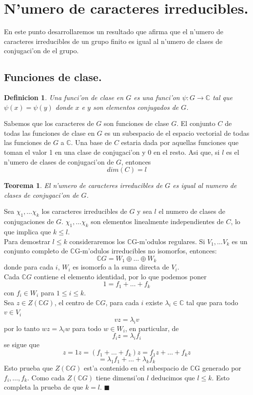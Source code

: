 \documentclass[a4paper,openright,12pt]{book}
\numberwithin{equation}{section} %
\newtheorem{teorema}{Teorema}[section] %
\newtheorem{definicion}{Definicion}[section] %
\newenvironment{proof}{\noindent{\it Demostracion:}}{\hfill$\blacksquare$} %
\begin{document}
\section{N'umero de caracteres irreducibles.}
En este punto desarrollaremos un resultado que afirma que el n'umero de caracteres irreducibles de un grupo finito es igual al n'umero de clases de conjugaci'on de el grupo.
\subsection{Funciones de clase.}
\begin{definicion}
Una funci'on de clase en $G$ es una funci'on $\psi : G \rightarrow \mathbb{C}$ tal que $\psi (x) = \psi (y)$ donde $x$ e $y$ son elementos conjugados de $G$.
\end{definicion}
Sabemos que los caracteres de $G$ son funciones de clase $G$. El conjunto $C$ de todas las funciones de clase en $G$ es un subespacio de el espacio vectorial de todas las funciones de $G$ a $\mathbb{C}$. Una base de $C$ estaria dada por aquellas funciones que toman el valor 1 en una clase de conjugaci'on y 0 en el resto. Asi que, si $l$ es el n'umero de clases de conjugaci'on de $G$, entonces
\[
dim(C)=l
\]
\begin{teorema}
El n'umero de caracteres irreducibles de $G$ es igual al numero de clases de conjugaci'on de $G$.
\end{teorema}
\begin{proof}
Sea $\chi_{1}, \ldots \chi_{k}$ los caracteres irreducibles de $G$ y sea $l$ el numero de clases de conjugaciones de $G$. $\chi_{1}, \ldots \chi_{k}$ son elementos linealmente independientes de $C$, lo que implica que $k \leq l$.\\
Para demostrar $l \leq k$ consideraremos los $\mathbb{C}$G-m'odulos regulares. Si $V_{1}, \ldots V_{k}$ es un conjunto completo de $\mathbb{C}$G-m'odulos irreducibles no isomorfos, entonces:
\[
\mathbb{C}G = W_{1} \oplus \ldots \oplus W_{k}
\]
donde para cada $i$, $W_{i}$ es isomorfo a la suma directa de $V_{i}$.\\
Cada $\mathbb{C}G$ contiene el elemento identidad, por lo que podemos poner
\[
1=f_{1}+ \ldots + f_{k}
\]
con $f_{i} \in W_{i}$ para $1 \leq i \leq k$.\\
Sea $z \in Z(\mathbb{C}G)$, el centro de $\mathbb{C}G$, para cada $i$ existe $\lambda_{i} \in \mathbb{C}$ tal que para todo $v \in V_{i}$
\[
vz=\lambda_{i}v
\]
por lo tanto $wz=\lambda_{i}w$ para todo $w \in W_{i}$, en particular, de 
\[
f_{i}z=\lambda_{i}f_{i}
\] 
se sigue que
\[
z=1z=(f_{1}+\ldots +f_{k})z=f_{1}z+ \ldots +f_{k}z
\]
\[
=\lambda_{1}f_{1} + \ldots + \lambda_{k}f_{k}
\]
Esto prueba que $Z(\mathbb{C}G)$ est'a contenido en el subespacio de $\mathbb{C}$G generado por $f_{i}, \ldots ,f_{k}$. Como cada $Z(\mathbb{C}G)$ tiene dimensi'on $l$ deducimos que $l \leq k$. Esto completa la prueba de que $k=l$. 
\end{proof}
\end{document}
